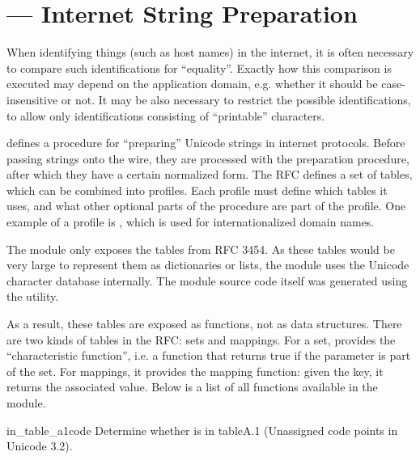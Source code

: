 \section{ ---
         Internet String Preparation}



When identifying things (such as host names) in the internet, it is
often necessary to compare such identifications for
``equality''. Exactly how this comparison is executed may depend on
the application domain, e.g. whether it should be case-insensitive or
not. It may be also necessary to restrict the possible
identifications, to allow only identifications consisting of
``printable'' characters.

 defines a procedure for ``preparing'' Unicode strings in
internet protocols. Before passing strings onto the wire, they are
processed with the preparation procedure, after which they have a
certain normalized form. The RFC defines a set of tables, which can be
combined into profiles. Each profile must define which tables it uses,
and what other optional parts of the  procedure are
part of the profile. One example of a  profile is
, which is used for internationalized domain names.

The module  only exposes the tables from RFC
3454. As these tables would be very large to represent them as
dictionaries or lists, the module uses the Unicode character database
internally. The module source code itself was generated using the
 utility.

As a result, these tables are exposed as functions, not as data
structures. There are two kinds of tables in the RFC: sets and
mappings. For a set,  provides the ``characteristic
function'', i.e. a function that returns true if the parameter is part
of the set. For mappings, it provides the mapping function: given the
key, it returns the associated value. Below is a list of all functions
available in the module.

\begin{funcdesc}{in_table_a1}{code}
Determine whether  is in table{A.1} (Unassigned code points
in Unicode 3.2).
\end{funcdesc}

